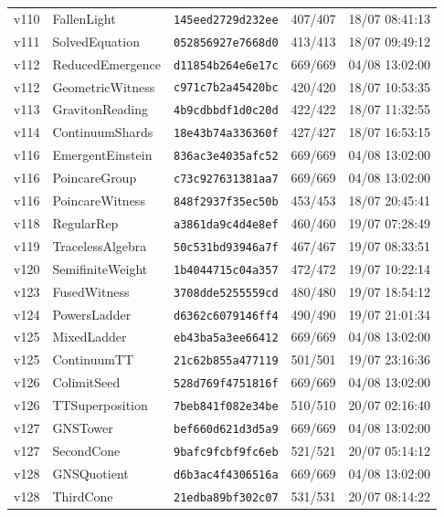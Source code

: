 \documentclass[11pt]{article}
\theoremstyle{definition}\newtheorem{deriv}{Derivation}
\begin{document}
{\begin{longtable}{@{}lllll@{}}
v110 & FallenLight & \texttt{145eed2729d232ee} & 407/407 & 18/07 08:41:13 \\
v111 & SolvedEquation & \texttt{052856927e7668d0} & 413/413 & 18/07 09:49:12 \\
v112 & ReducedEmergence & \texttt{d11854b264e6e17c} & 669/669 & 04/08 13:02:00 \\
v112 & GeometricWitness & \texttt{c971c7b2a45420bc} & 420/420 & 18/07 10:53:35 \\
v113 & GravitonReading & \texttt{4b9cdbbdf1d0c20d} & 422/422 & 18/07 11:32:55 \\
v114 & ContinuumShards & \texttt{18e43b74a336360f} & 427/427 & 18/07 16:53:15 \\
v116 & EmergentEinstein & \texttt{836ac3e4035afc52} & 669/669 & 04/08 13:02:00 \\
v116 & PoincareGroup & \texttt{c73c927631381aa7} & 669/669 & 04/08 13:02:00 \\
v116 & PoincareWitness & \texttt{848f2937f35ec50b} & 453/453 & 18/07 20:45:41 \\
v118 & RegularRep & \texttt{a3861da9c4d4e8ef} & 460/460 & 19/07 07:28:49 \\
v119 & TracelessAlgebra & \texttt{50c531bd93946a7f} & 467/467 & 19/07 08:33:51 \\
v120 & SemifiniteWeight & \texttt{1b4044715c04a357} & 472/472 & 19/07 10:22:14 \\
v123 & FusedWitness & \texttt{3708dde5255559cd} & 480/480 & 19/07 18:54:12 \\
v124 & PowersLadder & \texttt{d6362c6079146ff4} & 490/490 & 19/07 21:01:34 \\
v125 & MixedLadder & \texttt{eb43ba5a3ee66412} & 669/669 & 04/08 13:02:00 \\
v125 & ContinuumTT & \texttt{21c62b855a477119} & 501/501 & 19/07 23:16:36 \\
v126 & ColimitSeed & \texttt{528d769f4751816f} & 669/669 & 04/08 13:02:00 \\
v126 & TTSuperposition & \texttt{7beb841f082e34be} & 510/510 & 20/07 02:16:40 \\
v127 & GNSTower & \texttt{bef660d621d3d5a9} & 669/669 & 04/08 13:02:00 \\
v127 & SecondCone & \texttt{9bafc9fcbf9fc6eb} & 521/521 & 20/07 05:14:12 \\
v128 & GNSQuotient & \texttt{d6b3ac4f4306516a} & 669/669 & 04/08 13:02:00 \\
v128 & ThirdCone & \texttt{21edba89bf302c07} & 531/531 & 20/07 08:14:22 \\

\end{longtable}}
\end{document}
